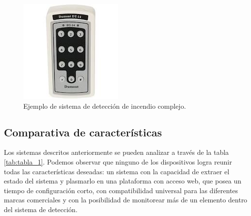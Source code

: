 \begin{figure}[h]
	\centering
	\includegraphics[scale=.4]{./Figures/Capitulo1/FIG_G1.jpeg}
	\caption{Ejemplo de sistema de detección de incendio complejo.}
	\label{fig:figura_g1}
\end{figure}

\subsection{Comparativa de características}

Los sistemas descritos anteriormente se pueden analizar a través de la tabla \ref{tab:tabla_1}. Podemos observar que ninguno de los dispositivos logra reunir todas las características deseadas: un sistema con la capacidad de extraer el estado del sistema y plasmarlo en una plataforma con acceso web, que posea un tiempo de configuración corto, con compatibilidad universal para las diferentes marcas comerciales y con la posibilidad de monitorear más de un elemento dentro del sistema de detección.

